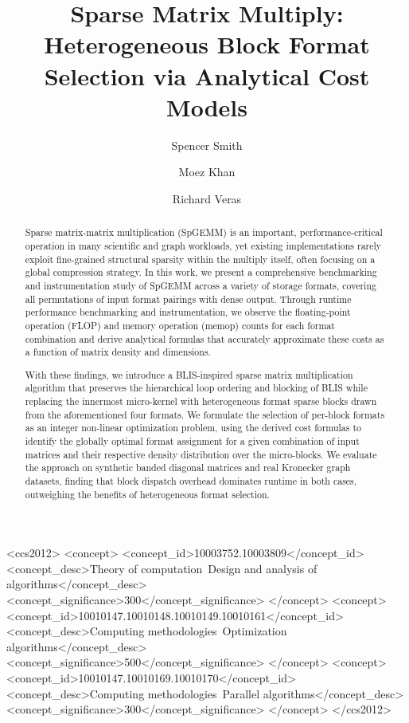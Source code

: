 \documentclass[sigconf, review, anonymous]{acmart}
\begin{document}
\title{Sparse Matrix Multiply: Heterogeneous Block Format Selection via Analytical Cost Models}

\author{Spencer Smith}

\author{Moez Khan}

\author{Richard Veras}

\begin{abstract}
Sparse matrix-matrix multiplication (SpGEMM) is an important, performance-critical operation in
many scientific and graph workloads, yet existing implementations rarely exploit fine-grained
structural sparsity within the multiply itself, often focusing on a
global compression strategy. In this work, we present a
comprehensive benchmarking and instrumentation study of SpGEMM across a variety
of storage formats, covering all permutations of input format pairings
with dense output. Through runtime performance benchmarking and instrumentation,
we observe the floating-point operation (FLOP) and memory operation (memop) counts
for each format combination and derive analytical formulas that accurately approximate
these costs as a function of matrix density and dimensions.

With these findings, we introduce a BLIS-inspired sparse matrix multiplication algorithm
that preserves the hierarchical loop ordering and blocking of BLIS while replacing
the innermost micro-kernel with heterogeneous format sparse blocks drawn from
the aforementioned four formats. We formulate the selection of per-block formats as
an integer non-linear optimization problem, using the derived cost formulas to identify the
globally optimal format assignment for a given combination of input matrices and
their respective density distribution over the micro-blocks. We evaluate the approach
on synthetic banded diagonal matrices and real Kronecker graph datasets,
finding that block dispatch overhead dominates runtime in both cases, outweighing
the benefits of heterogeneous format selection.
\end{abstract}

\begin{CCSXML}
<ccs2012>
   <concept>
       <concept_id>10003752.10003809</concept_id>
       <concept_desc>Theory of computation~Design and analysis of algorithms</concept_desc>
       <concept_significance>300</concept_significance>
       </concept>
   <concept>
       <concept_id>10010147.10010148.10010149.10010161</concept_id>
       <concept_desc>Computing methodologies~Optimization algorithms</concept_desc>
       <concept_significance>500</concept_significance>
       </concept>
   <concept>
       <concept_id>10010147.10010169.10010170</concept_id>
       <concept_desc>Computing methodologies~Parallel algorithms</concept_desc>
       <concept_significance>300</concept_significance>
       </concept>
 </ccs2012>
\end{CCSXML}
\end{document}
